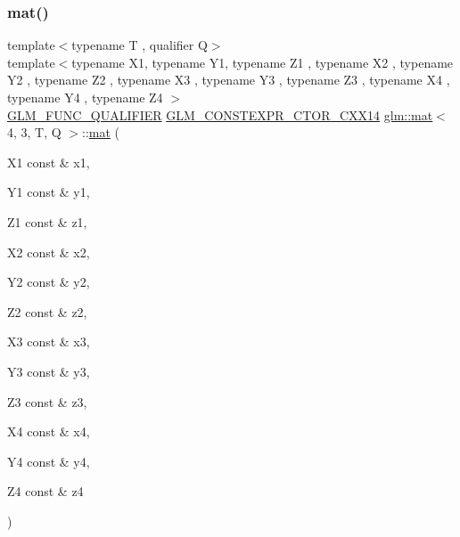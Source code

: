 \subsubsection{\texorpdfstring{mat()}{mat()}\hspace{0.1cm}{\footnotesize\ttfamily [19/21]}}
{\footnotesize\ttfamily template$<$typename T , qualifier Q$>$ \\
template$<$typename X1, typename Y1, typename Z1 , typename X2 , typename Y2 , typename Z2 , typename X3 , typename Y3 , typename Z3 , typename X4 , typename Y4 , typename Z4 $>$ \\
\mbox{\hyperlink{setup_8hpp_a33fdea6f91c5f834105f7415e2a64407}{G\+L\+M\+\_\+\+F\+U\+N\+C\+\_\+\+Q\+U\+A\+L\+I\+F\+I\+ER}} \mbox{\hyperlink{setup_8hpp_a0900f9145e68bf6061b6f5e7be3fa751}{G\+L\+M\+\_\+\+C\+O\+N\+S\+T\+E\+X\+P\+R\+\_\+\+C\+T\+O\+R\+\_\+\+C\+X\+X14}} \mbox{\hyperlink{structglm_1_1mat}{glm\+::mat}}$<$ 4, 3, T, Q $>$\+::\mbox{\hyperlink{structglm_1_1mat}{mat}} (\begin{DoxyParamCaption}\item[{X1 const \&}]{x1,  }\item[{Y1 const \&}]{y1,  }\item[{Z1 const \&}]{z1,  }\item[{X2 const \&}]{x2,  }\item[{Y2 const \&}]{y2,  }\item[{Z2 const \&}]{z2,  }\item[{X3 const \&}]{x3,  }\item[{Y3 const \&}]{y3,  }\item[{Z3 const \&}]{z3,  }\item[{X4 const \&}]{x4,  }\item[{Y4 const \&}]{y4,  }\item[{Z4 const \&}]{z4 }\end{DoxyParamCaption})}

\mbox{\label{structglm_1_1mat_3_014_00_013_00_01_t_00_01_q_01_4_a51464174c591e7c9c6feea63148a686c}} 
